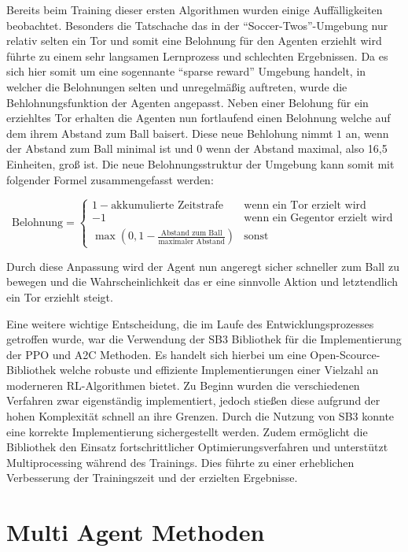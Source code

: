 Bereits beim Training dieser ersten Algorithmen wurden einige Auffälligkeiten beobachtet. Besonders die Tatschache das in der ``Soccer-Twos''-Umgebung nur relativ selten ein Tor und somit eine Belohnung für den Agenten erziehlt wird führte zu einem sehr langsamen Lernprozess und schlechten Ergebnissen. Da es sich hier somit um eine sogennante ``sparse reward'' Umgebung handelt, in welcher die Belohnungen selten und unregelmäßig auftreten, wurde die Behlohnungsfunktion der Agenten angepasst. Neben einer Belohung für ein erziehltes Tor erhalten die Agenten nun fortlaufend einen Belohnung welche auf dem ihrem Abstand zum Ball baisert. Diese neue Behlohung nimmt \(1\) an, wenn der Abstand zum Ball minimal ist und \(0\) wenn der Abstand maximal, also 16,5 Einheiten, groß ist. Die neue Belohnungsstruktur der Umgebung kann somit mit folgender Formel zusammengefasst werden:

\[
\text{Belohnung} = \begin{cases} 
	1 - \text{akkumulierte Zeitstrafe} & \text{wenn ein Tor erzielt wird} \\
	-1 & \text{wenn ein Gegentor erzielt wird} \\
	\max\left(0, 1 - \frac{\text{Abstand zum Ball}}{\text{maximaler Abstand}}\right) & \text{sonst}
\end{cases}
\]

Durch diese Anpassung wird der Agent nun angeregt sicher schneller zum Ball zu bewegen und die Wahrscheinlichkeit das er eine sinnvolle Aktion und letztendlich ein Tor erziehlt steigt.

Eine weitere wichtige Entscheidung, die im Laufe des Entwicklungsprozesses getroffen wurde, war die Verwendung der \ac{SB3} Bibliothek \cite{stable-baselines3} für die Implementierung der \ac{PPO} und \ac{A2C} Methoden. Es handelt sich hierbei um eine Open-Scource-Bibliothek welche robuste und effiziente Implementierungen einer Vielzahl an moderneren \ac{RL}-Algorithmen bietet.
Zu Beginn wurden die verschiedenen Verfahren zwar eigenständig implementiert, jedoch stießen diese aufgrund der hohen Komplexität schnell an ihre Grenzen. Durch die Nutzung von \ac{SB3} konnte eine korrekte Implementierung sichergestellt werden. Zudem ermöglicht die Bibliothek den Einsatz fortschrittlicher Optimierungsverfahren und unterstützt Multiprocessing während des Trainings. Dies führte zu einer erheblichen Verbesserung der Trainingszeit und der erzielten Ergebnisse.

\section{Multi Agent Methoden}

